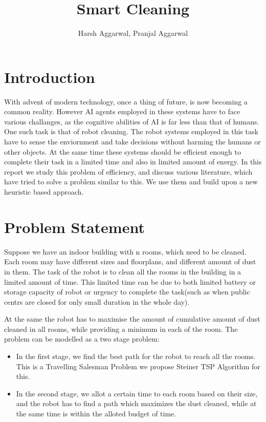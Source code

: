 \documentclass{article}
\title{Smart Cleaning}
\author{Harsh Aggarwal, Pranjal Aggarwal}
\date{}
\begin{document}
\maketitle

\section{Introduction}

With advent of modern technology, once a thing of future, is now becoming a common reality. However AI agents employed
in these systems have to face various challanges, as the cognitive abilities of AI is far less than that of humans. 
One such task is that of robot cleaning. The robot systems employed in this task have to sense the enviornment
and take decisions without harming the humans or other objects. At the same time these systems should be efficient enough to complete their task in
a limited time and also in limited amount of energy. In this report we study this problem of efficiency, and discuss various literature, which have tried to solve a problem similar to this.
We use them and build upon a new heuristic based approach.

\section{Problem Statement}

Suppose we have an indoor building with n rooms, which need to be cleaned. Each room may have different sizes
and floorplans, and different amount of dust in them. The task of the robot is to clean all the rooms in the building in a limited amount of time.
This limited time can be due to both limited battery or storage capacity of robot or urgency to complete the task(such as when public centrs are closed for only small duration in the whole day).

At the same the robot has to maximise the amount of cumulative amount of dust cleaned in all rooms, while providing a minimum in each of the room.
The problem can be modelled as a two stage problem:
\begin{itemize}
    \item In the first stage, we find the best path for the robot to reach all the rooms. This is a Travelling Salesman Problem we propose Steiner TSP Algorithm for this.
    \item In the second stage, we allot a certain time to each room based on their size, and the robot has to find a path which maximizes the dust cleaned, while at the same time is within the alloted budget of time.
\end{itemize}
\end{document}
